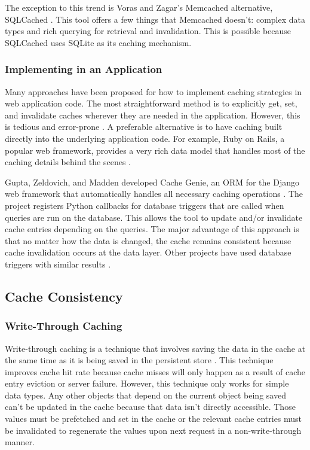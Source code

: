 \documentclass[12pt]{ucthesis}
\begin{document}
The exception to this trend is Voras and Zagar's \textsf{Memcached} alternative, SQLCached \cite{sqlCached}.
This tool offers a few things that \textsf{Memcached} doesn't: complex data types and rich querying for retrieval and invalidation.
This is possible because SQLCached uses SQLite as its caching mechanism.

\subsubsection{Implementing in an Application}
Many approaches have been proposed for how to implement caching strategies in web application code.
The most straightforward method is to explicitly get, set, and invalidate caches wherever they are needed in the application.
However, this is tedious and error-prone \cite{keyBasedCacheExpiration, triggerBasedORM}.
A preferable alternative is to have caching built directly into the underlying application code.
For example, Ruby on Rails, a popular web framework, provides a very rich data model that handles most of the caching details behind the scenes \cite{keyBasedCacheExpiration}.

Gupta, Zeldovich, and Madden developed Cache Genie, an ORM for the Django web framework that automatically handles all necessary caching operations \cite{triggerBasedORM}.
The project registers Python callbacks for database triggers that are called when queries are run on the database.
This allows the tool to update and/or invalidate cache entries depending on the queries.
The major advantage of this approach is that no matter how the data is changed, the cache remains consistent because cache invalidation occurs at the data layer.
Other projects have used database triggers with similar results \cite{scalableConsistentCaching}.

\subsection{Cache Consistency}
\subsubsection{Write-Through Caching}
Write-through caching is a technique that involves saving the data in the cache at the same time as it is being saved in the persistent store \cite{writeThroughCaching}.
This technique improves cache hit rate because cache misses will only happen as a result of cache entry eviction or server failure.
However, this technique only works for simple data types.
Any other objects that depend on the current object being saved can't be updated in the cache because that data isn't directly accessible.
Those values must be prefetched and set in the cache or the relevant cache entries must be invalidated to regenerate the values upon next request in a non-write-through manner.
\end{document}
